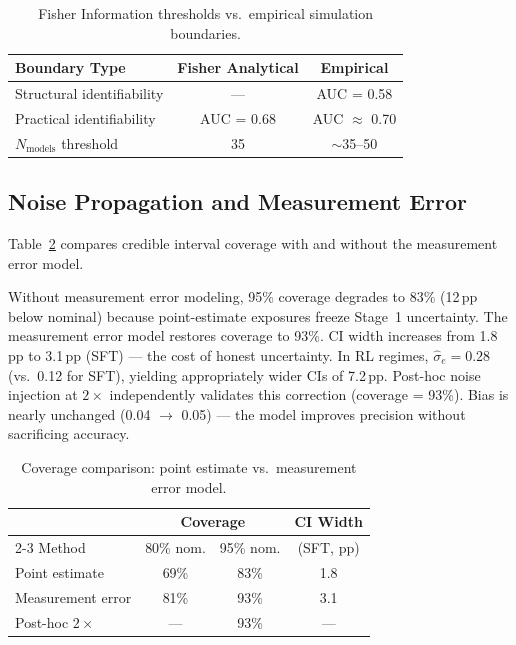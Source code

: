 \documentclass[letterpaper]{article}
\begin{document}
\begin{table}[t]
\centering
\caption{Fisher Information thresholds vs.\ empirical simulation boundaries.}
\label{tab:fisher}
\begin{tabular}{lcc}
\toprule
Boundary Type & Fisher Analytical & Empirical \\
\midrule
Structural identifiability & --- & AUC = 0.58 \\
Practical identifiability  & AUC = 0.68 & AUC $\approx$ 0.70 \\
$N_{\text{models}}$ threshold & 35 & $\sim$35--50 \\
\bottomrule
\end{tabular}
\end{table}

\subsection{Noise Propagation and Measurement Error}
\label{sec:noise}

Table~\ref{tab:coverage_noise} compares credible interval coverage with and without the measurement error model.

Without measurement error modeling, 95\% coverage degrades to 83\% (12\,pp below nominal) because point-estimate exposures freeze Stage~1 uncertainty.
The measurement error model restores coverage to 93\%.
CI width increases from 1.8\,pp to 3.1\,pp (SFT) --- the cost of honest uncertainty.
In RL regimes, $\hat{\sigma}_e = 0.28$ (vs.\ 0.12 for SFT), yielding appropriately wider CIs of 7.2\,pp.
Post-hoc noise injection at $2\times$ independently validates this correction (coverage = 93\%).
Bias is nearly unchanged (0.04 $\to$ 0.05) --- the model improves precision without sacrificing accuracy.

\begin{table}[t]
\centering
\caption{Coverage comparison: point estimate vs.\ measurement error model.}
\label{tab:coverage_noise}
\begin{tabular}{lccc}
\toprule
 & \multicolumn{2}{c}{Coverage} & CI Width \\
\cmidrule(lr){2-3}
Method & 80\% nom. & 95\% nom. & (SFT, pp) \\
\midrule
Point estimate      & 69\% & 83\% & 1.8 \\
Measurement error   & 81\% & 93\% & 3.1 \\
Post-hoc $2\times$  & ---  & 93\% & --- \\
\bottomrule
\end{tabular}
\end{table}
\end{document}

